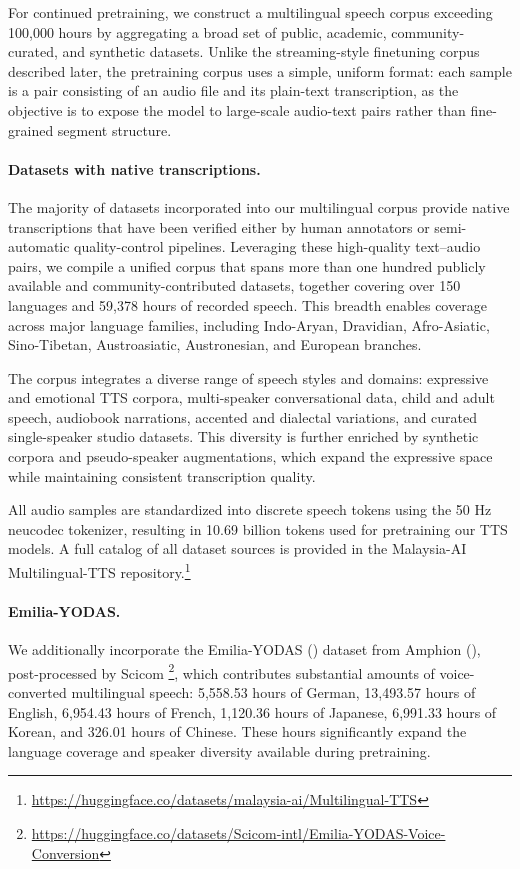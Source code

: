 \documentclass{article}
\begin{document}
For continued pretraining, we construct a multilingual speech corpus exceeding 100{,}000 hours by aggregating a broad set of public, academic, community-curated, and synthetic datasets. Unlike the streaming-style finetuning corpus described later, the pretraining corpus uses a simple, uniform format: each sample is a pair consisting of an audio file and its plain-text transcription, as the objective is to expose the model to large-scale audio-text pairs rather than fine-grained segment structure.

\paragraph{Datasets with native transcriptions.}

The majority of datasets incorporated into our multilingual corpus provide native transcriptions that have been verified either by human annotators or semi-automatic quality-control pipelines. Leveraging these high-quality text–audio pairs, we compile a unified corpus that spans more than one hundred publicly available and community-contributed datasets, together covering over 150 languages and 59,378 hours of recorded speech. This breadth enables coverage across major language families, including Indo-Aryan, Dravidian, Afro-Asiatic, Sino-Tibetan, Austroasiatic, Austronesian, and European branches.

The corpus integrates a diverse range of speech styles and domains: expressive and emotional TTS corpora, multi-speaker conversational data, child and adult speech, audiobook narrations, accented and dialectal variations, and curated single-speaker studio datasets. This diversity is further enriched by synthetic corpora and pseudo-speaker augmentations, which expand the expressive space while maintaining consistent transcription quality.

All audio samples are standardized into discrete speech tokens using the 50 Hz neucodec tokenizer, resulting in 10.69 billion tokens used for pretraining our TTS models. A full catalog of all dataset sources is provided in the Malaysia-AI Multilingual-TTS repository.\footnote{\url{https://huggingface.co/datasets/malaysia-ai/Multilingual-TTS}}

\paragraph{Emilia-YODAS.}

We additionally incorporate the Emilia-YODAS (\citet{emilia}) dataset from Amphion (\citet{amphion}), post-processed by Scicom \footnote{ \url{https://huggingface.co/datasets/Scicom-intl/Emilia-YODAS-Voice-Conversion}}, which contributes substantial amounts of voice-converted multilingual speech: 5{,}558.53 hours of German, 13{,}493.57 hours of English, 6{,}954.43 hours of French, 1{,}120.36 hours of Japanese, 6{,}991.33 hours of Korean, and 326.01 hours of Chinese. These hours significantly expand the language coverage and speaker diversity available during pretraining.
\end{document}
